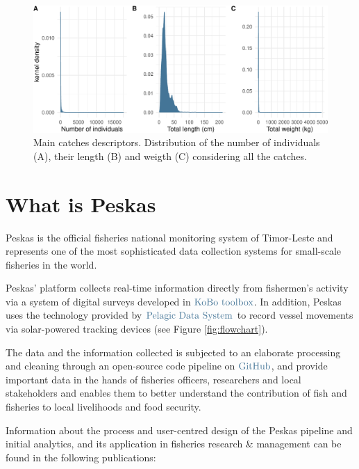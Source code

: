 \documentclass[
]{article}
\begin{document}
\begin{figure}
\includegraphics[width=1\linewidth,height=1\textheight]{data_report_files/figure-latex/unnamed-chunk-7-1} \caption{Main catches descriptors. Distribution of the number of individuals (A), their length (B)  and weigth (C) considering all the catches.}\label{fig:unnamed-chunk-7}
\end{figure}

\hypertarget{what-is-peskas}{%
\section{What is Peskas}\label{what-is-peskas}}

Peskas is the official fisheries national monitoring system of Timor-Leste and represents one of the most sophisticated data collection systems for small-scale fisheries in the world.

Peskas' platform collects real-time information directly from fishermen's activity via a system of digital surveys developed in \href{http://www.kobotoolbox.org/}{\(\color{myblue}{\text{KoBo toolbox}}\)}. In addition, Peskas uses the technology provided by \href{https://www.pelagicdata.com/}{\(\color{myblue}{\text{Pelagic Data System}}\)} to record vessel movements via solar-powered tracking devices (see Figure \ref{fig:flowchart}).

The data and the information collected is subjected to an elaborate processing and cleaning through an open-source code pipeline on \href{https://github.com/WorldFishCenter/peskas.timor.data.pipeline}{\(\color{myblue}{\text{GitHub}}\)}, and provide important data in the hands of fisheries officers, researchers and local stakeholders and enables them to better understand the contribution of fish and fisheries to local livelihoods and food security.

Information about the process and user-centred design of the Peskas pipeline and initial analytics, and its application in fisheries research \& management can be found in the following publications:
\end{document}

